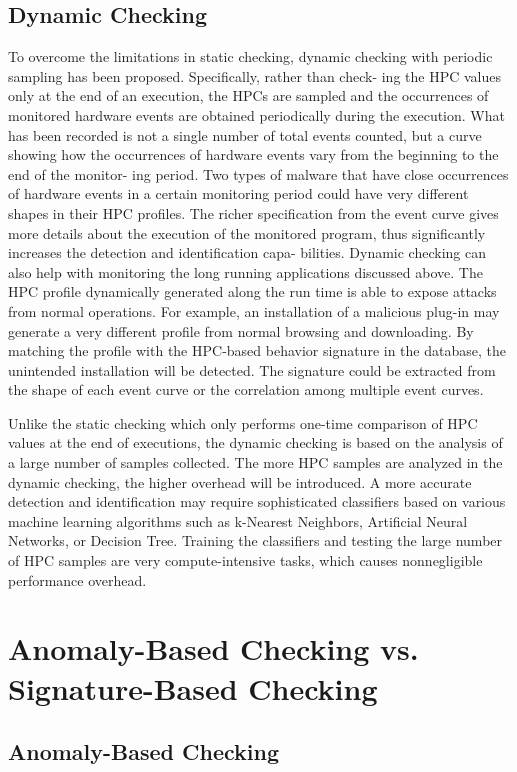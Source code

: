 \documentclass[12pt]{report}
\begin{document}
\subsection{Dynamic Checking}
To overcome the limitations in static checking, dynamic
checking with periodic sampling has been proposed. Specifically, rather than check-
ing the HPC values only at the end of an execution,  the HPCs are sampled and  the
occurrences of monitored hardware events  are obtained periodically during the execution. What has
been recorded is not a single number of total events counted, but a curve showing how
the occurrences of hardware events vary from the beginning to the end of the monitor-
ing period. Two types of malware that have close occurrences of hardware events in a
certain monitoring period could have very different shapes in their HPC profiles. The
richer specification from the event curve gives more details about the execution of the
monitored program, thus significantly increases the detection and identification capa-
bilities. Dynamic checking can also help with monitoring the long running applications
discussed above. The HPC profile dynamically generated along the run time is able
to expose attacks from normal operations. For example, an installation of a malicious
plug-in may generate a very different profile from normal browsing and downloading.
By matching the profile with the HPC-based behavior signature in the database, the
unintended installation will be detected. The signature could be extracted from the
shape of each event curve or the correlation among multiple event curves.


Unlike the static checking which only performs one-time comparison of HPC values at
the end of executions, the dynamic checking is based on the analysis of a large number
of samples collected. The more HPC samples are analyzed in the dynamic checking, the
higher overhead will be introduced. A more accurate detection and identification may
require sophisticated classifiers based on various machine learning algorithms such
as k-Nearest Neighbors, Artificial Neural Networks, or Decision Tree. Training the
classifiers and testing the large number of HPC samples are very compute-intensive
tasks, which causes nonnegligible performance
overhead.

\section{Anomaly-Based Checking vs. Signature-Based Checking}
\subsection{Anomaly-Based Checking}
\end{document}
